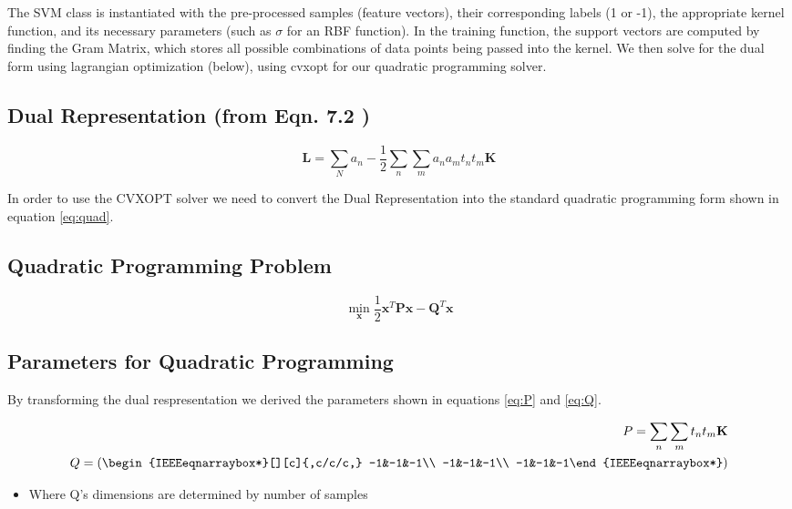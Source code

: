 \documentclass[journal]{IEEEtran}
\begin{document}
    The SVM class is instantiated with the pre-processed samples (feature vectors), their corresponding labels (1 or -1), the appropriate kernel function, and its necessary parameters (such as $\sigma$ for an RBF function).  In the training function, the support vectors are computed by finding the Gram Matrix, which stores all possible combinations of data points being passed into the kernel. We then solve for the dual form using lagrangian optimization (below), using cvxopt for our quadratic programming solver.

    \subsection{Dual Representation (from Eqn. 7.2 \cite{BishopBook})}
    \begin{equation}
    \mathbf{L} = \sum\limits_{N} a_n - \frac{1}{2} \sum\limits_{n} \sum\limits_{m} a_n a_m t_n t_m \mathbf{K}
    \end{equation}

    In order to use the CVXOPT solver we need to convert the Dual Representation into the standard quadratic programming form shown in equation \ref{eq:quad}.

    \subsection{Quadratic Programming Problem \cite{QuadraticCVXOPT}}
    \begin{equation}
    \label{eq:quad}
    \min_{\mathbf{x}} \frac{1}{2}\mathbf{x}^T\mathbf{P}\mathbf{x} - \mathbf{Q}^T\mathbf{x}
    \end{equation}

    \subsection{Parameters for Quadratic Programming}

    By transforming the dual respresentation we derived the parameters shown in equations \ref{eq:P} and \ref{eq:Q}.

    \begin{eqnarray}
    \label{eq:P}
    P = \sum\limits_{n} \sum\limits_{m} t_n t_m \mathbf{K}\\
    \label{eq:Q}
    Q = \left(\begin{IEEEeqnarraybox*}[][c]{,c/c/c,}
    -1&-1&-1\\
    -1&-1&-1\\
    -1&-1&-1%
    \end{IEEEeqnarraybox*}\right)
    \end{eqnarray}
    \begin{itemize}
    \item Where Q's dimensions are determined by number of samples
    \end{itemize}
\end{document}
